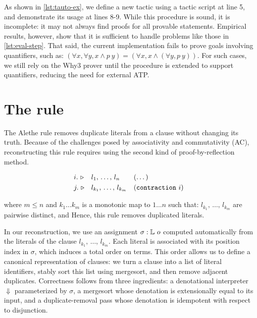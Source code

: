 As shown in \cref{lst:tauto-ex}, we define a new tactic  using a tactic script at line 5, and demonstrate its usage at lines 8-9.
While this procedure is sound, it is incomplete: it may not always find proofs for all provable statements.
Empirical results, however, show that it is sufficient to handle problems like those in \cref{lst:eval-step}.
That said, the current implementation fails to prove goals involving quantifiers, such as:
$(\forall x, \forall y, x \land p~y) = (\forall x, x \land (\forall y, p~y))$.
For such cases, we still rely on the Why3 prover until the procedure is extended to support quantifiers, reducing the need for external ATP.

\section{The \texttt{} rule}
\label{sec:contraction-recon}

The Alethe rule  removes duplicate literals from a clause without changing its truth.
Because of the challenges posed by associativity and commutativity (AC), reconstructing this rule requires using the second kind of proof-by-reflection method.

\begin{align*}
&i.~\triangleright &  &l_1,\, \dots,\, l_{n}       & & (\dots)  \\
&j.~\triangleright &  &l_{k_1},\, \dots,\, l_{k_m} & & (\texttt{\upshape{contraction}}~i) 
\end{align*}

where $m \leq n$ and $k_1 \dots k_m$ is a monotonic map to $1 \dots n$ such that: $l_{k_1},\, \dots,\, l_{k_m}$ are pairwise distinct, and Hence, this rule removes duplicated literals.

In our reconstruction, we use an assignment $\sigma: \mathbb{L}~o$ computed automatically from the literals of the clause $l_{k_1},\, \dots,\, l_{k_m}$.
Each literal is associated with its position index in $\sigma$, which induces a total order on terms. 
This order allows us to define a canonical representation of clauses: we turn a clause into a list of literal identifiers, stably sort this list using mergesort, and then remove adjacent duplicates.  
Correctness follows from three ingredients: a denotational interpreter $\Downarrow$ parameterized by $\sigma$, a mergesort whose denotation is extensionally equal to its input, and a duplicate-removal pass whose denotation is idempotent with respect to disjunction.

